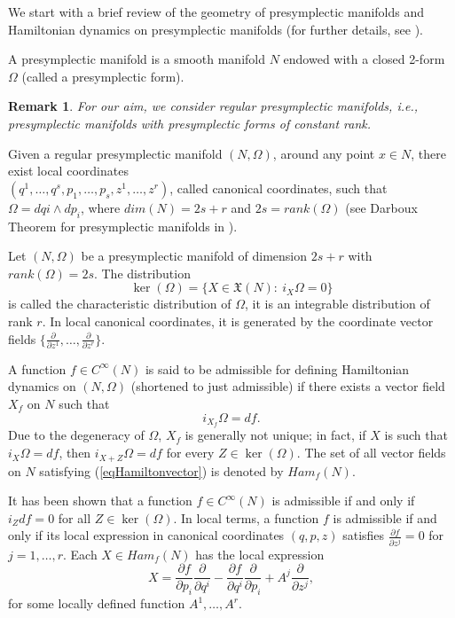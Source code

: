 \documentclass[10pt,a4paper]{article}
\newtheorem{remark}{Remark}
\begin{document}
We start with a brief review of the geometry of presymplectic manifolds and Hamiltonian dynamics on presymplectic manifolds (for further details, see \cite{gotay1978presymplectic,carinena1985canonical,echeverria1999reduction,bursztyn2013brief}).

A presymplectic manifold is a smooth manifold $N$ endowed with a closed 2-form $\Omega$ (called a presymplectic form). 

\begin{remark}
For our aim, we consider regular presymplectic manifolds, i.e., presymplectic manifolds with presymplectic forms of constant rank.
\end{remark}
Given a regular presymplectic manifold $(N,\Omega)$, around any point $x\in N$, there exist local coordinates\\ $(q^{1},\ldots,q^{s},p_{1},\ldots,p_{s},z^{1},\ldots,z^{r})$, called canonical coordinates, such that $\Omega=dq{i}\wedge dp_{i}$, where $dim(N)=2s+r$ and $2s=rank(\Omega)$ (see Darboux Theorem for presymplectic manifolds in \cite{gracia2024darboux}).

Let $(N,\Omega)$ be a presymplectic manifold of dimension $2s+r$ with $rank(\Omega)=2s$. The distribution 
$$\ker(\Omega)=\lbrace X\in\mathfrak{X}(N):\ i_{X}\Omega=0 \rbrace$$
is called the characteristic distribution of $\Omega$, it is an integrable distribution of rank $r$. In local canonical coordinates, it is generated by the coordinate vector fields $\lbrace \frac{\partial}{\partial z^{1}},\ldots,\frac{\partial}{\partial z^{r}}\rbrace$. 

A function $f\in C^{\infty}(N)$ is said to be admissible for defining Hamiltonian dynamics on $(N,\Omega)$ (shortened to just admissible) if there exists a vector field $X_{f}$ on $N$ such that 
\begin{equation}
\label{eqHamiltonvector}
i_{X_{f}}\Omega=df. 
\end{equation}
Due to the degeneracy of $\Omega$, $X_{f}$ is generally not unique; in fact, if $X$ is such that $i_{X}\Omega=df$, then $i_{X+Z}\Omega=df$ for every $Z\in\ker(\Omega)$. The set of all vector fields on $N$ satisfying (\ref{eqHamiltonvector}) is denoted by $Ham_{f}(N)$.

It has been shown that a function $f\in C^{\infty}(N)$ is admissible if and only if $i_{Z}df=0$ for all $Z\in\ker(\Omega)$. In local terms, a function $f$ is admissible if and only if its local expression in canonical coordinates $(q,p,z)$ satisfies $\frac{\partial f}{\partial z^{j}}=0$ for $j=1,\ldots,r.$ Each $X\in Ham_{f}(N)$ has the local expression
\begin{equation*}
X=\frac{\partial f}{\partial p_{i}}\frac{\partial}{\partial q^{i}}-\frac{\partial f}{\partial q^{i}}\frac{\partial}{\partial p_{i}}+A^{j}\frac{\partial}{\partial z^{j}},
\end{equation*}
for some locally defined function $A^{1},\ldots,A^{r}$.
\end{document}
